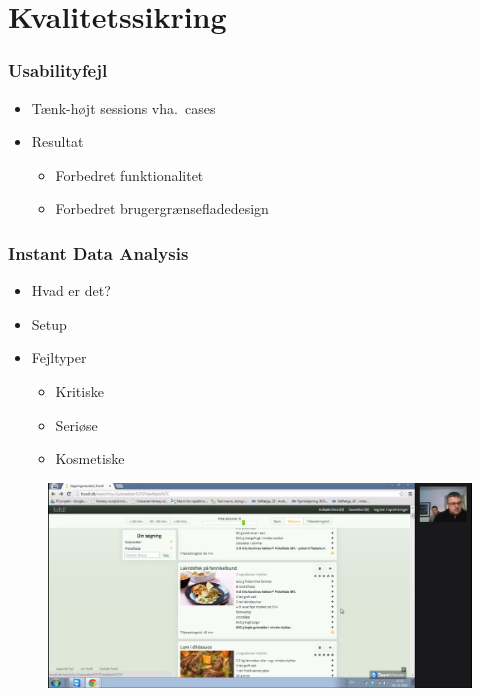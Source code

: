 \section{Kvalitetssikring}

\begin{frame}
	\frametitle{Usabilityfejl}
  \begin{itemize}
    \item Tænk-højt sessions vha.\ cases
    \item Resultat
    \begin{itemize}
      \item Forbedret funktionalitet
      \item Forbedret brugergrænsefladedesign
    \end{itemize}
  \end{itemize}
\end{frame}

\begin{frame}
	\frametitle{Instant Data Analysis}
  \begin{itemize}
    \item Hvad er det?
	  \item Setup
    \item Fejltyper
      \begin{itemize}
        \item Kritiske
        \item Seriøse
        \item Kosmetiske
      \end{itemize}
  \end{itemize}
\end{frame}

\begin{frame}[fragile]
  \begin{figure}
  \includegraphics[width=\textwidth]{billeder/keldIDA.png}
  \end{figure}
\end{frame}

